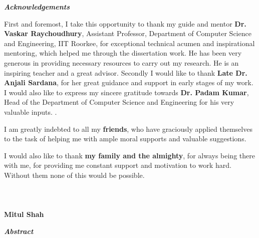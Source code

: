 \documentclass [a4paper,12pt]{book}
\begin{document}
\setcounter{page}{2}
\begin{center}
\textbf{\emph{Acknowledgements}}
\end{center}
\vspace{0.8cm}

First and foremost, I take this opportunity to thank my guide and mentor \textbf{Dr. Vaskar Raychoudhury}, Assistant Professor, Department of Computer Science and Engineering, IIT Roorkee, for exceptional technical acumen and inspirational mentoring, which helped me through the dissertation work. He has been very generous in providing necessary resources to carry out my research. He is an inspiring teacher and a great advisor. Secondly I would like to thank \textbf{Late Dr. Anjali Sardana}, for her great guidance and support in early stages of my work. I would also like to express my sincere gratitude towards \textbf{Dr. Padam Kumar}, Head of the Department of Computer Science and Engineering for his very valuable inputs. . 

I am greatly indebted to all my \textbf{friends}, who have graciously applied themselves to the task of helping me with ample moral supports and valuable suggestions.

I would also like to thank \textbf{my family and the almighty}, for always being there with me, for providing me constant support and motivation to work hard. Without them none of this would be possible.
\\\\\\\\
\hspace*{33em}\textbf{Mitul Shah}
\mbox{}
\newpage
\begin{center}
\textbf{\emph{Abstract}}
\end{center}
\vspace{0.8cm}
\par
\end{document}

